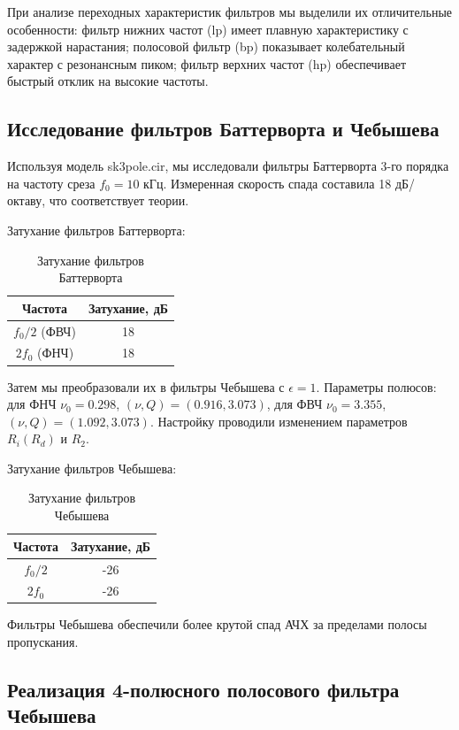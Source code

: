 При анализе переходных характеристик фильтров мы выделили их отличительные особенности: фильтр нижних частот (lp) имеет плавную характеристику с задержкой нарастания; полосовой фильтр (bp) показывает колебательный характер с резонансным пиком; фильтр верхних частот (hp) обеспечивает быстрый отклик на высокие частоты.

\subsection{Исследование фильтров Баттерворта и Чебышева}

Используя модель sk3pole.cir, мы исследовали фильтры Баттерворта 3-го порядка на частоту среза $f_0 = 10$ кГц. Измеренная скорость спада составила 18 дБ/октаву, что соответствует теории.

Затухание фильтров Баттерворта:
\begin{longtable}[c]{|c|c|}
\caption{Затухание фильтров Баттерворта}
\label{tab:butterworth_attenuation}\\
\hline
Частота & Затухание, дБ \\ \hline
\endfirsthead
%
\endhead
%
$f_0/2$ (ФВЧ) & 18 \\ \hline
$2f_0$ (ФНЧ) & 18 \\ \hline
\end{longtable}

Затем мы преобразовали их в фильтры Чебышева с $\epsilon = 1$. Параметры полюсов: для ФНЧ $\nu_0 = 0.298$, $(\nu, Q) = (0.916, 3.073)$, для ФВЧ $\nu_0 = 3.355$, $(\nu, Q) = (1.092, 3.073)$. Настройку проводили изменением параметров $R_i(R_d)$ и $R_2$.

Затухание фильтров Чебышева:
\begin{longtable}[c]{|c|c|}
\caption{Затухание фильтров Чебышева}
\label{tab:chebyshev_attenuation}\\
\hline
Частота & Затухание, дБ \\ \hline
\endfirsthead
%
\endhead
%
$f_0/2$ & -26 \\ \hline
$2f_0$ & -26 \\ \hline
\end{longtable}

Фильтры Чебышева обеспечили более крутой спад АЧХ за пределами полосы пропускания.

\subsection{Реализация 4-полюсного полосового фильтра Чебышева}

